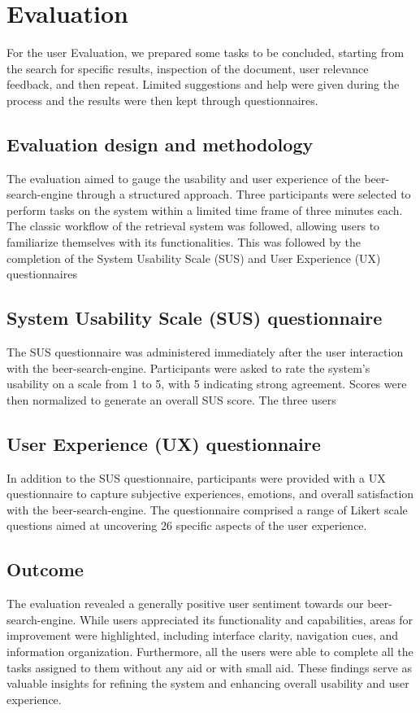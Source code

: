\section{Evaluation}

For the user Evaluation, we prepared some tasks to be concluded, starting from the search for specific results, inspection of the document, user relevance feedback, and then repeat. Limited suggestions and help were given during the process and the results were then kept through questionnaires.

\subsection{Evaluation design and methodology}

The evaluation aimed to gauge the usability and user experience of the beer-search-engine through a structured approach. Three participants were selected to perform tasks on the system within a limited time frame of three minutes each. The classic workflow of the retrieval system was followed, allowing users to familiarize themselves with its functionalities. This was followed by the completion of the System Usability Scale (SUS) and User Experience (UX) questionnaires

\subsection{System Usability Scale (SUS) questionnaire}

The SUS questionnaire was administered immediately after the user interaction with the beer-search-engine. Participants were asked to rate the system's usability on a scale from 1 to 5, with 5 indicating strong agreement. Scores were then normalized to generate an overall SUS score. The three users

\subsection{User Experience (UX) questionnaire}

In addition to the SUS questionnaire, participants were provided with a UX questionnaire to capture subjective experiences, emotions, and overall satisfaction with the beer-search-engine. The questionnaire comprised a range of Likert scale questions aimed at uncovering 26 specific aspects of the user experience.

\subsection{Outcome}

The evaluation revealed a generally positive user sentiment towards our beer-search-engine. While users appreciated its functionality and capabilities, areas for improvement were highlighted, including interface clarity, navigation cues, and information organization. Furthermore, all the users were able to complete all the tasks assigned to them without any aid or with small aid. These findings serve as valuable insights for refining the system and enhancing overall usability and user experience.